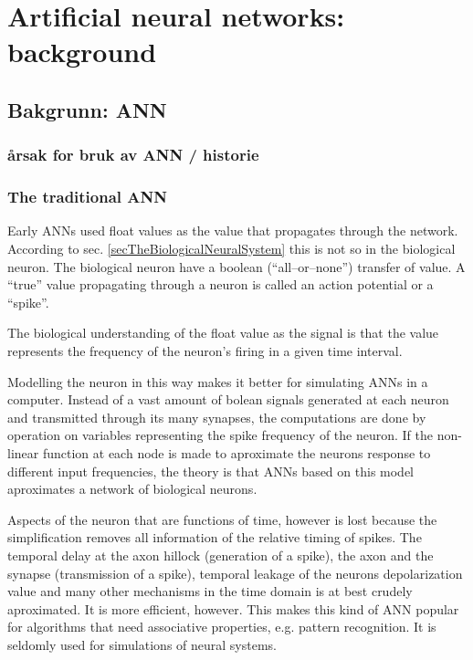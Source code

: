 
\chapter{Artificial neural networks: background} %


\section{Bakgrunn: ANN}
	\subsection{årsak for bruk av ANN / historie}
	
	\subsection{The traditional ANN}
Early ANNs used float values as the value that propagates through the network. According to sec. \ref{secTheBiologicalNeuralSystem} this is not so in the biological neuron.
The biological neuron have a boolean (``all--or--none'') transfer of value. A ``true'' value propagating through a neuron is called an action potential or a ``spike''.

The biological understanding of the float value as the signal is that the value represents the frequency of the neuron's firing in a given time interval.

Modelling the neuron in this way makes it better for simulating ANNs in a computer. 
Instead of a vast amount of bolean signals generated at each neuron and transmitted through its many synapses, the computations are done by operation on variables representing the spike frequency of the neuron.
If the non-linear function at each node is made to aproximate the neurons response to different input frequencies, the theory is that ANNs based on this model aproximates a network of biological neurons.

Aspects of the neuron that are functions of time, however is lost because the simplification removes all information of the relative timing of spikes.
The temporal delay at the axon hillock (generation of a spike), the axon and the synapse (transmission of a spike), temporal leakage of the neurons depolarization value and many other mechanisms in the time domain is at best crudely aproximated.
It is more efficient, however. This makes this kind of ANN popular for algorithms that need associative properties, e.g. pattern recognition. It is seldomly used for simulations of neural systems.

